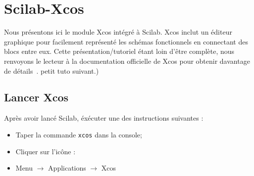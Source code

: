 \newpage
\section{Scilab-Xcos}
Nous présentons ici le module Xcos intégré à Scilab. Xcos inclut un 
éditeur graphique pour facilement représenté les schémas fonctionnels
en connectant des blocs entre eux. Cette présentation/tutoriel étant loin 
d'être complète, nous renvoyons le lecteur à la documentation officielle de Xcos
pour obtenir davantage de détails~\cite{steer2014scilab,premier,xcos}. 
petit tuto suivant.)

\subsection{Lancer Xcos}
Après avoir lancé Scilab, éxécuter une des instructions suivantes :
\begin{itemize}
    \item Taper la commande \verb?xcos? dans la console;
    \item Cliquer sur l'icône : 
    \item Menu $\rightarrow$ Applications $\rightarrow$ Xcos
\end{itemize}


